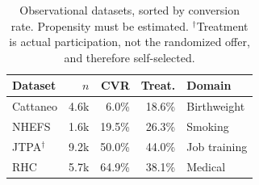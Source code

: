 \documentclass{article}
\begin{document}
\begin{table}[H]
\centering
\caption{Observational datasets, sorted by conversion rate. Propensity must be
estimated. $^\dagger$Treatment is actual participation, not the randomized
offer, and therefore self-selected.}
\label{tab:obs-v2}
\setlength{\tabcolsep}{6pt}
\begin{tabular}{lrrrl}
\toprule
Dataset & $n$ & CVR & Treat. & Domain \\
\midrule
Cattaneo \citep{cattaneo2010} & 4.6k & 6.0\% & 18.6\% & Birthweight \\
NHEFS \citep{hernan2020} & 1.6k & 19.5\% & 26.3\% & Smoking \\
JTPA$^\dagger$ \citep{abadie2002} & 9.2k & 50.0\% & 44.0\% & Job training \\
RHC \citep{connors1996rhc} & 5.7k & 64.9\% & 38.1\% & Medical \\
\bottomrule
\end{tabular}
\end{table}
\end{document}

